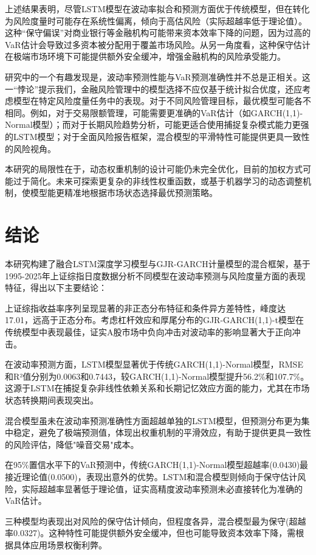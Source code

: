\documentclass[12pt, a4paper]{article}
\begin{document}
上述结果表明，尽管LSTM模型在波动率拟合和预测方面优于传统模型，但在转化为风险度量时可能存在系统性偏离，倾向于高估风险（实际超越率低于理论值）。这种“保守偏误”对商业银行等金融机构可能带来资本效率下降的问题，因为过高的VaR估计会导致过多资本被分配用于覆盖市场风险。从另一角度看，这种保守估计在极端市场环境下可能提供额外安全缓冲，增强金融机构的风险承受能力。

研究中的一个有趣发现是，波动率预测性能与VaR预测准确性并不总是正相关。这一“悖论”提示我们，金融风险管理中的模型选择不应仅基于统计拟合优度，还应考虑模型在特定风险度量任务中的表现。对于不同风险管理目标，最优模型可能各不相同。例如，对于交易限额管理，可能需要更准确的VaR估计（如GARCH(1,1)-Normal模型）；而对于长期风险趋势分析，可能更适合使用捕捉复杂模式能力更强的LSTM模型；对于全面风险报告框架，混合模型的平滑特性可能提供更具一致性的风险视角。

本研究的局限性在于，动态权重机制的设计可能仍未完全优化，目前的加权方式可能过于简化。未来可探索更复杂的非线性权重函数，或基于机器学习的动态调整机制，使模型能更精准地根据市场状态选择最优预测策略。

\section{结论}

本研究构建了融合LSTM深度学习模型与GJR-GARCH计量模型的混合框架，基于1995-2025年上证综指日度数据分析不同模型在波动率预测与风险度量方面的表现特征，得出以下主要结论：

上证综指收益率序列呈现显著的非正态分布特征和条件异方差特性，峰度达17.01，远高于正态分布。考虑杠杆效应和厚尾分布的GJR-GARCH(1,1)-t模型在传统模型中表现最佳，证实A股市场中负向冲击对波动率的影响显著大于正向冲击。

在波动率预测方面，LSTM模型显著优于传统GARCH(1,1)-Normal模型，RMSE和R²值分别为0.0063和0.7443，较GARCH(1,1)-Normal模型提升56.2\%和107.7\%。这源于LSTM在捕捉复杂非线性依赖关系和长期记忆效应方面的能力，尤其在市场状态转换期间表现突出。

混合模型虽未在波动率预测准确性方面超越单独的LSTM模型，但预测分布更为集中稳定，避免了极端预测值，体现出权重机制的平滑效应，有助于提供更具一致性的风险评估，降低"噪音交易"成本。

在95\%置信水平下的VaR预测中，传统GARCH(1,1)-Normal模型超越率(0.0430)最接近理论值(0.0500)，表现出意外的优势。LSTM和混合模型则倾向于保守估计风险，实际超越率显著低于理论值，证实高精度波动率预测未必直接转化为准确的VaR估计。

三种模型均表现出对风险的保守估计倾向，但程度各异，混合模型最为保守(超越率0.0327)。这种特性可能提供额外安全缓冲，但也可能导致资本效率下降，需根据具体应用场景权衡利弊。
\end{document}
